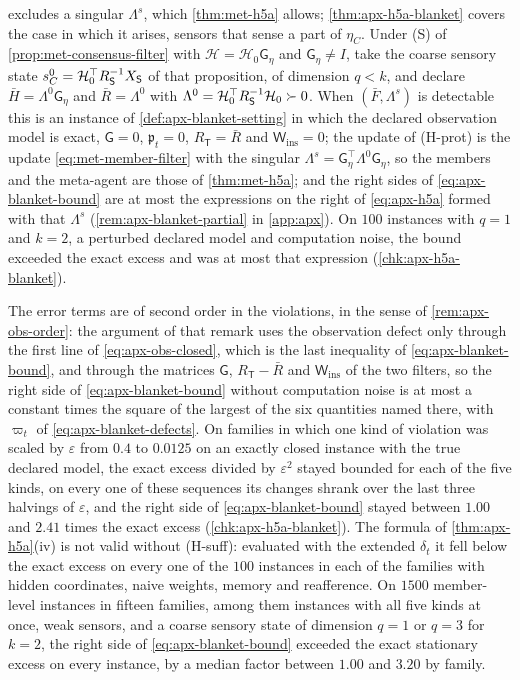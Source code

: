  excludes a singular $\Lambda^s$, which \cref{thm:met-h5a} allows; \cref{thm:apx-h5a-blanket} covers the case in which it arises, sensors that sense a part of $\eta_C$. Under (S) of \cref{prop:met-consensus-filter} with $\mathcal H=\mathcal H_0\mathsf G_\eta$ and $\mathsf G_\eta\ne I$, take the coarse sensory state $s^0_C=\mathcal H_0^\top R_{\mathsf{S}}^{-1}X_{\mathsf{S}}$ of that proposition, of dimension $q<k$, and declare $\bar H=\Lambda^0\mathsf G_\eta$ and $\bar R=\Lambda^0$ with $\Lambda^0=\mathcal H_0^\top R_{\mathsf{S}}^{-1}\mathcal H_0\succ0$. When $(\bar F,\Lambda^s)$ is detectable this is an instance of \cref{def:apx-blanket-setting} in which the declared observation model is exact, $\mathsf G=0$, $\mathfrak p_t=0$, $R_{\mathsf T}=\bar R$ and $\mathsf W_{\mathrm{ins}}=0$; the update of (H-prot) is the update \eqref{eq:met-member-filter} with the singular $\Lambda^s=\mathsf G_\eta^\top\Lambda^0\mathsf G_\eta$, so the members and the meta-agent are those of \cref{thm:met-h5a}; and the right sides of \eqref{eq:apx-blanket-bound} are at most the expressions on the right of \eqref{eq:apx-h5a} formed with that $\Lambda^s$ (\cref{rem:apx-blanket-partial} in \cref{app:apx}). On $100$ instances with $q=1$ and $k=2$, a perturbed declared model and computation noise, the bound exceeded the exact excess and was at most that expression (\cref{chk:apx-h5a-blanket}).

The error terms are of second order in the violations, in the sense of \cref{rem:apx-obs-order}: the argument of that remark uses the observation defect only through the first line of \eqref{eq:apx-obs-closed}, which is the last inequality of \eqref{eq:apx-blanket-bound}, and through the matrices $\mathsf G$, $R_{\mathsf T}-\bar R$ and $\mathsf W_{\mathrm{ins}}$ of the two filters, so the right side of \eqref{eq:apx-blanket-bound} without computation noise is at most a constant times the square of the largest of the six quantities named there, with $\varpi_t$ of \eqref{eq:apx-blanket-defects}. On families in which one kind of violation was scaled by $\varepsilon$ from $0.4$ to $0.0125$ on an exactly closed instance with the true declared model, the exact excess divided by $\varepsilon^2$ stayed bounded for each of the five kinds, on every one of these sequences its changes shrank over the last three halvings of $\varepsilon$, and the right side of \eqref{eq:apx-blanket-bound} stayed between $1.00$ and $2.41$ times the exact excess (\cref{chk:apx-h5a-blanket}). The formula of \cref{thm:apx-h5a}(iv) is not valid without (H-suff): evaluated with the extended $\delta_t$ it fell below the exact excess on every one of the $100$ instances in each of the families with hidden coordinates, naive weights, memory and reafference. On $1500$ member-level instances in fifteen families, among them instances with all five kinds at once, weak sensors, and a coarse sensory state of dimension $q=1$ or $q=3$ for $k=2$, the right side of \eqref{eq:apx-blanket-bound} exceeded the exact stationary excess on every instance, by a median factor between $1.00$ and $3.20$ by family.

